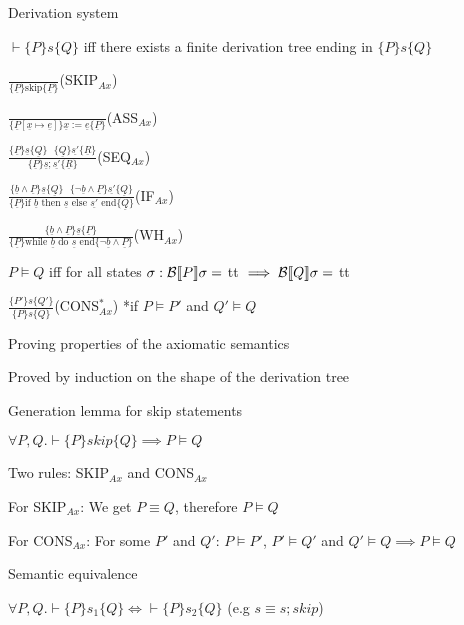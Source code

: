 	\enumend
	\item Derivation system
	\enumstart
		\item $\vdash \{P\}s\{Q\}$ iff there exists a finite derivation tree ending in $\{P\}s\{Q\}$
		\item $\frac{}{\{\underline{P}\}\text{skip}\{\underline{P}\}}$(SKIP$_{Ax}$)
		\item $\frac{}{\{\underline{P}[\underline{x} \mapsto \underline{e}]\}\underline{x}:=\underline{e}\{\underline{P}\}}$(ASS$_{Ax}$)
		\item $\frac{\{\underline{P}\}\underline{s}\{\underline{Q}\} \ \ \ \{\underline{Q}\}\underline{s'}\{\underline{R}\}}{\{\underline{P}\}\underline{s};\underline{s'}\{\underline{R}\}}$(SEQ$_{Ax}$)
		\item $\frac{\{\underline{b} \land \underline{P}\}\underline{s}\{\underline{Q}\} \ \ \ \{\lnot\underline{b} \land \underline{P}\}\underline{s'}\{\underline{Q}\}}{\{\underline{P}\}\text{if }\underline{b}\text{ then }\underline{s}\text{ else }\underline{s'}\text{ end}\{\underline{Q}\}}$(IF$_{Ax}$)
		\item $\frac{\{\underline{b} \land \underline{P}\}\underline{s}\{\underline{P}\}}{\{\underline{P}\}\text{while }\underline{b}\text{ do }\underline{s}\text{ end}\{\lnot\underline{b} \land \underline{P}\}}$(WH$_{Ax}$)
		\item $P \vDash Q$ iff for all states $\sigma: \mathcal{B}\llbracket P\rrbracket \sigma =$ tt $\implies \mathcal{B}\llbracket Q\rrbracket \sigma =$ tt
		\item $\frac{\{P'\}s\{Q'\}}{\{P\}s\{Q\}}$(CONS$_{Ax}^*$) *if $P \vDash P'$ and $Q' \vDash Q$
	\enumend
	\item Proving properties of the axiomatic semantics
	\enumstart
		\item Proved by induction on the shape of the derivation tree
		\item Generation lemma for skip statements
		\enumstart
			\item $\forall P, Q. \vdash \{P\}skip\{Q\} \implies P \vDash Q$
			\item Two rules: SKIP$_{Ax}$ and CONS$_{Ax}$
			\item For SKIP$_{Ax}$: We get $P \equiv Q$, therefore $P \vDash Q$
			\item For CONS$_{Ax}$: For some $P'$ and $Q'$: $P \vDash P'$, $P' \vDash Q'$ and $Q' \vDash Q \implies P \vDash Q$
		\enumend
		\item Semantic equivalence
		\enumstart
			\item $\forall P,Q. \vdash \{P\}s_1\{Q\} \Leftrightarrow \vdash \{P\}s_2\{Q\}$ (e.g $s \equiv s;skip$)
